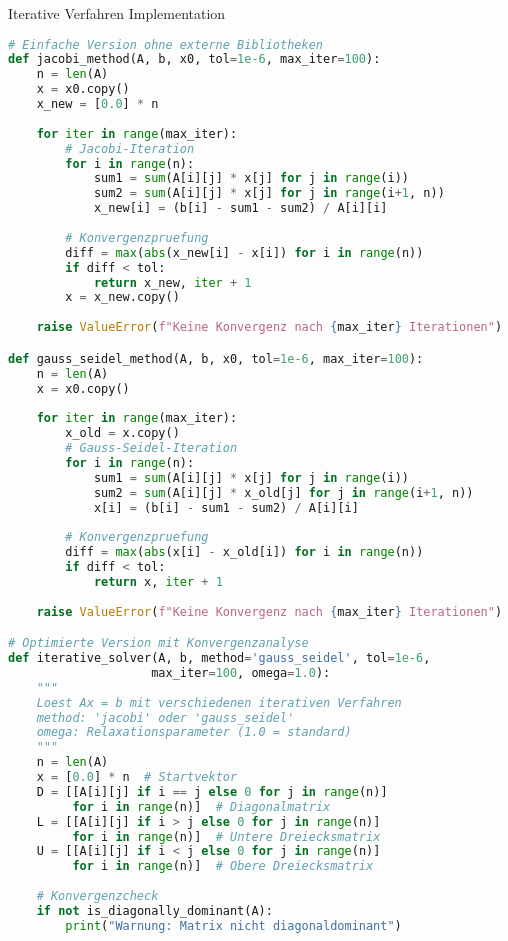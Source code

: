 \begin{examplecode}{Iterative Verfahren Implementation}
\begin{lstlisting}[language=Python, style=basesmol]
# Einfache Version ohne externe Bibliotheken
def jacobi_method(A, b, x0, tol=1e-6, max_iter=100):
    n = len(A)
    x = x0.copy()
    x_new = [0.0] * n
    
    for iter in range(max_iter):
        # Jacobi-Iteration
        for i in range(n):
            sum1 = sum(A[i][j] * x[j] for j in range(i))
            sum2 = sum(A[i][j] * x[j] for j in range(i+1, n))
            x_new[i] = (b[i] - sum1 - sum2) / A[i][i]
            
        # Konvergenzpruefung
        diff = max(abs(x_new[i] - x[i]) for i in range(n))
        if diff < tol:
            return x_new, iter + 1
        x = x_new.copy()
        
    raise ValueError(f"Keine Konvergenz nach {max_iter} Iterationen")

def gauss_seidel_method(A, b, x0, tol=1e-6, max_iter=100):
    n = len(A)
    x = x0.copy()
    
    for iter in range(max_iter):
        x_old = x.copy()
        # Gauss-Seidel-Iteration
        for i in range(n):
            sum1 = sum(A[i][j] * x[j] for j in range(i))
            sum2 = sum(A[i][j] * x_old[j] for j in range(i+1, n))
            x[i] = (b[i] - sum1 - sum2) / A[i][i]
            
        # Konvergenzpruefung
        diff = max(abs(x[i] - x_old[i]) for i in range(n))
        if diff < tol:
            return x, iter + 1
            
    raise ValueError(f"Keine Konvergenz nach {max_iter} Iterationen")

# Optimierte Version mit Konvergenzanalyse
def iterative_solver(A, b, method='gauss_seidel', tol=1e-6, 
                    max_iter=100, omega=1.0):
    """
    Loest Ax = b mit verschiedenen iterativen Verfahren
    method: 'jacobi' oder 'gauss_seidel'
    omega: Relaxationsparameter (1.0 = standard)
    """
    n = len(A)
    x = [0.0] * n  # Startvektor
    D = [[A[i][j] if i == j else 0 for j in range(n)] 
         for i in range(n)]  # Diagonalmatrix
    L = [[A[i][j] if i > j else 0 for j in range(n)] 
         for i in range(n)]  # Untere Dreiecksmatrix
    U = [[A[i][j] if i < j else 0 for j in range(n)] 
         for i in range(n)]  # Obere Dreiecksmatrix
    
    # Konvergenzcheck
    if not is_diagonally_dominant(A):
        print("Warnung: Matrix nicht diagonaldominant")
    

\end{lstlisting}
\end{examplecode}

